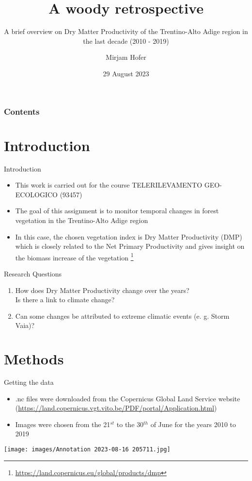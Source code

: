 \documentclass[pdf]{beamer}
\title{A woody retrospective}
\subtitle{A brief overview on Dry Matter Productivity of the Trentino-Alto Adige region in the last decade (2010 - 2019)}  %
\author{Mirjam Hofer} %
\institute{}
\date[\textcolor{white}{29 August 2023}]  %
{29 August 2023}
\begin{document}
\frame{\titlepage}
\begin{frame}
\frametitle{Contents}
\tableofcontents
\end{frame}
\section{Introduction}
    \begin{frame}{Introduction}
    \begin{itemize}
        \item This work is carried out for the course TELERILEVAMENTO GEO-ECOLOGICO (93457)
        \item The goal of this assignment is to monitor temporal changes in forest vegetation in the Trentino-Alto Adige region
        \item In this case, the chosen vegetation index is Dry Matter Productivity (DMP) which is closely related to the Net Primary Productivity and gives insight on the biomass increase of the vegetation \footnote{\tiny \url{https://land.copernicus.eu/global/products/dmp}}
    \end{itemize}
    \end{frame}

    \begin{frame}{Research Questions}
        \begin{enumerate}
            \item How does Dry Matter Productivity change over the years? \\
            Is there a link to climate change?
            \item Can some changes be attributed to extreme climatic events (e. g. Storm Vaia)?
        \end{enumerate}
    \end{frame}


\section{Methods}

\begin{frame}{Getting the data}
    \begin{itemize}
        \item .nc files were downloaded from the Copernicus Global Land Service website ({\tiny \url{https://land.copernicus.vgt.vito.be/PDF/portal/Application.html}})
        \item Images were chosen from the 21$^{st}$ to the 30$^{th}$ of June for the years 2010 to 2019
        \end{itemize}

    \vspace{2 em}
    \centering
    \texttt{[image: images/Annotation 2023-08-16 205711.jpg]}
\end{frame}
\end{document}
